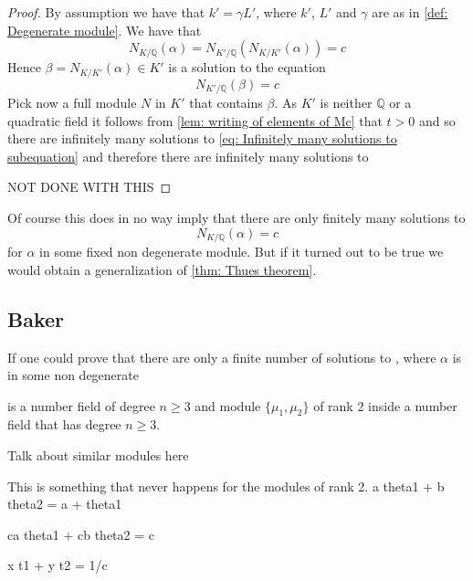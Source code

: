 \documentclass{article}
\newcommand{\mbb}[1]{\mathbb{#1}}
\begin{document}
\begin{proof}
    By assumption we have that $k' = \gamma L'$, where $k'$, $L'$ and $\gamma$ are as in \cref{def: Degenerate module}. We have that 
    $$N_{K / \mbb Q}(\alpha) = N_{K' / \mbb Q}(N_{K / K'}(\alpha)) = c$$
    Hence $\beta = N_{K / K'}(\alpha) \in K'$ is a solution to the equation
    \begin{equation}\label{eq: Infinitely many solutions to subequation}
        N_{K' / \mbb Q}(\beta) = c
    \end{equation}
    Pick now a full module $N$ in $K'$ that contains $\beta$. As $K'$ is neither $\mbb Q$ or a quadratic field it follows from \cref{lem: writing of elements of Mc} that $t > 0$ and so there are infinitely many solutions to \cref{eq: Infinitely many solutions to subequation} and therefore there are infinitely many solutions to 

    NOT DONE WITH THIS
\end{proof}
Of course this does in no way imply that there are only finitely many solutions to
$$N_{K/\mbb Q}(\alpha) = c$$
for $\alpha$ in some fixed non degenerate module. But if it turned out to be true we would obtain a generalization of \cref{thm: Thues theorem}. 


\subsection*{Baker}

If one could prove that there are only a finite number of solutions to , where $\alpha$ is in some non degenerate 


is a number field of degree $n \geq 3$ and  module $\{\mu_1, \mu_2 \}$ of rank 2 inside a number field that has degree $n \geq 3$. 



Talk about similar modules here




This is something that never happens for the modules of rank 2. a theta1 + b theta2 = a + theta1

ca theta1 + cb theta2 = c 



x t1 + y t2 = 1/c
\end{document}
